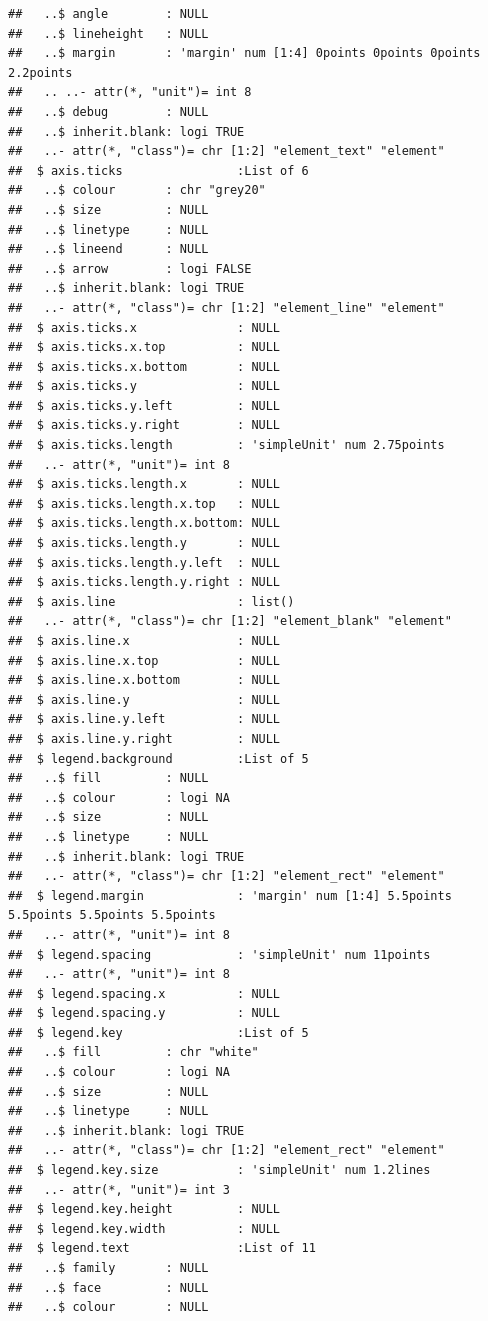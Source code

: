 \documentclass{article}\usepackage[]{graphicx}\usepackage[]{color}
\makeatletter
\newenvironment{kframe}{%
 \def\at@end@of@kframe{}%
 \ifinner\ifhmode%
  \def\at@end@of@kframe{\end{minipage}}%
  \begin{minipage}{\columnwidth}%
 \fi\fi%
 \def\FrameCommand##1{\hskip\@totalleftmargin \hskip-\fboxsep
 \colorbox{shadecolor}{##1}\hskip-\fboxsep
     \hskip-\linewidth \hskip-\@totalleftmargin \hskip\columnwidth}%
 \MakeFramed {\advance\hsize-\width
   \@totalleftmargin\z@ \linewidth\hsize
   \@setminipage}}%
 {\par\unskip\endMakeFramed%
 \at@end@of@kframe}
\newenvironment{knitrout}{}{} %
\makeatother
\begin{document}
\begin{enumerate}
\begin{enumerate}
\begin{knitrout}
\begin{kframe}
\begin{verbatim}
##   ..$ angle        : NULL
##   ..$ lineheight   : NULL
##   ..$ margin       : 'margin' num [1:4] 0points 0points 0points 2.2points
##   .. ..- attr(*, "unit")= int 8
##   ..$ debug        : NULL
##   ..$ inherit.blank: logi TRUE
##   ..- attr(*, "class")= chr [1:2] "element_text" "element"
##  $ axis.ticks                :List of 6
##   ..$ colour       : chr "grey20"
##   ..$ size         : NULL
##   ..$ linetype     : NULL
##   ..$ lineend      : NULL
##   ..$ arrow        : logi FALSE
##   ..$ inherit.blank: logi TRUE
##   ..- attr(*, "class")= chr [1:2] "element_line" "element"
##  $ axis.ticks.x              : NULL
##  $ axis.ticks.x.top          : NULL
##  $ axis.ticks.x.bottom       : NULL
##  $ axis.ticks.y              : NULL
##  $ axis.ticks.y.left         : NULL
##  $ axis.ticks.y.right        : NULL
##  $ axis.ticks.length         : 'simpleUnit' num 2.75points
##   ..- attr(*, "unit")= int 8
##  $ axis.ticks.length.x       : NULL
##  $ axis.ticks.length.x.top   : NULL
##  $ axis.ticks.length.x.bottom: NULL
##  $ axis.ticks.length.y       : NULL
##  $ axis.ticks.length.y.left  : NULL
##  $ axis.ticks.length.y.right : NULL
##  $ axis.line                 : list()
##   ..- attr(*, "class")= chr [1:2] "element_blank" "element"
##  $ axis.line.x               : NULL
##  $ axis.line.x.top           : NULL
##  $ axis.line.x.bottom        : NULL
##  $ axis.line.y               : NULL
##  $ axis.line.y.left          : NULL
##  $ axis.line.y.right         : NULL
##  $ legend.background         :List of 5
##   ..$ fill         : NULL
##   ..$ colour       : logi NA
##   ..$ size         : NULL
##   ..$ linetype     : NULL
##   ..$ inherit.blank: logi TRUE
##   ..- attr(*, "class")= chr [1:2] "element_rect" "element"
##  $ legend.margin             : 'margin' num [1:4] 5.5points 5.5points 5.5points 5.5points
##   ..- attr(*, "unit")= int 8
##  $ legend.spacing            : 'simpleUnit' num 11points
##   ..- attr(*, "unit")= int 8
##  $ legend.spacing.x          : NULL
##  $ legend.spacing.y          : NULL
##  $ legend.key                :List of 5
##   ..$ fill         : chr "white"
##   ..$ colour       : logi NA
##   ..$ size         : NULL
##   ..$ linetype     : NULL
##   ..$ inherit.blank: logi TRUE
##   ..- attr(*, "class")= chr [1:2] "element_rect" "element"
##  $ legend.key.size           : 'simpleUnit' num 1.2lines
##   ..- attr(*, "unit")= int 3
##  $ legend.key.height         : NULL
##  $ legend.key.width          : NULL
##  $ legend.text               :List of 11
##   ..$ family       : NULL
##   ..$ face         : NULL
##   ..$ colour       : NULL

\end{verbatim}
\end{kframe}
\end{knitrout}
\end{enumerate}
\end{enumerate}
\end{document}
